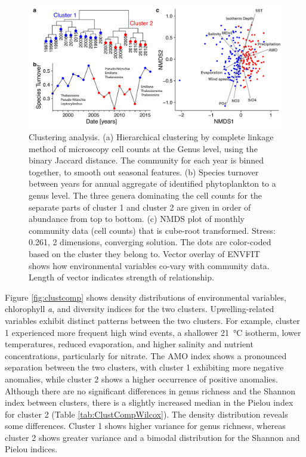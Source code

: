 \documentclass[draft]{agujournal2019}
\begin{document}
    \begin{figure}
    \noindent\includegraphics[width=\textwidth]{fig/Figure4_ClusteringNMDS_v2.pdf}
    \caption{Clustering analysis. (a) Hierarchical clustering by complete linkage method of microscopy cell counts at the Genus level, using the binary Jaccard distance. The community for each year is binned together, to smooth out seasonal features. (b) Species turnover between years for annual aggregate of identified phytoplankton to a genus level. The three genera dominating the cell counts for the separate parts of cluster 1 and cluster 2 are given in order of abundance from top to bottom. (c) NMDS plot of monthly community data (cell counts) that is cube-root transformed. Stress: 0.261, 2 dimensions, converging solution. The dots are color-coded based on the cluster they belong to. Vector overlay of ENVFIT shows how environmental variables co-vary with community data. Length of vector indicates strength of relationship.}
    \label{fig:clustering}
    \end{figure}
    
    Figure \ref{fig:clustcomp} shows density distributions of environmental variables, chlorophyll \textit{a}, and diversity indices for the two clusters. Upwelling-related variables exhibit distinct patterns between the two clusters. For example, cluster 1 experienced more frequent high wind events, a shallower \qty{21}{\celsius} isotherm, lower temperatures, reduced evaporation, and higher salinity and nutrient concentrations, particularly for nitrate. The AMO index shows a pronounced separation between the two clusters, with cluster 1 exhibiting more negative anomalies, while cluster 2 shows a higher occurrence of positive anomalies. Although there are no significant differences in genus richness and the Shannon index between clusters, there is a slightly increased median in the Pielou index for cluster 2 (Table \ref{tab:ClustCompWilcox}). The density distribution reveals some differences. Cluster 1 shows higher variance for genus richness, whereas cluster 2 shows greater variance and a bimodal distribution for the Shannon and Pielou indices. 
    
\end{document}
